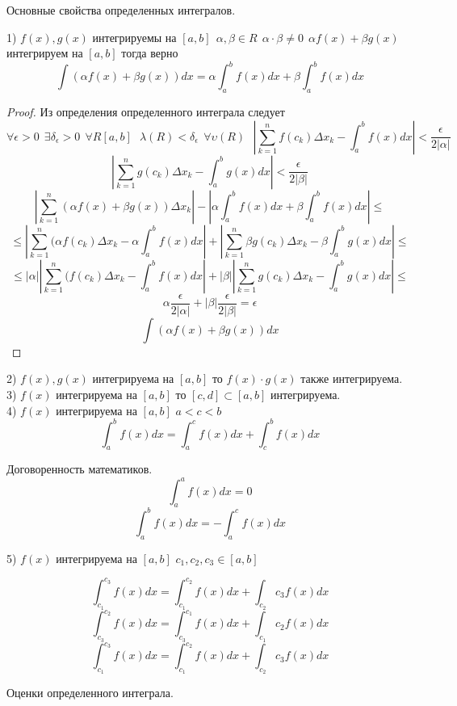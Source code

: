 \begin{title}[\Large]
    Основные свойства определенных интегралов.
\end{title}

1) $f(x), g(x)$ интегрируемы на $[a, b] ~~ \alpha , \beta \in R ~~ \alpha \cdot
\beta \not= 0 ~~ \alpha f(x) + \beta g(x)$ интегрируем на $[a, b]$ тогда верно
\[
    \int (\alpha f(x) + \beta g(x))dx = \alpha \int_a^b f(x)dx
    + \beta \int_a^b f(x)dx
\]

\begin{proof}
    Из определения определенного интеграла следует
    \[
        \forall\epsilon>0 ~~ \exists\delta_{\epsilon}>0 ~~ \forall R[a,b] ~~~
        \lambda(R) < \delta_{\epsilon} ~~ \forall\upsilon(R) ~~~
        \left| \sum_{k=1}^{n} f(c_k)\Delta x_k -
        \int_a^b f(x)dx \right| < \frac{\epsilon}{2|\alpha|}
    \]
    \[
        \left| \sum_{k=1}^{n} g(c_k)\Delta x_k -
        \int_a^b g(x)dx \right| < \frac{\epsilon}{2|\beta|}
    \]
    \[
        \left| \sum_{k=1}^{n} (\alpha f(x) + \beta g(x))\Delta x_k \right| -
        \left| \alpha \int_a^b f(x)dx + \beta \int_a^b f(x)dx \right| \le
    \]
    \[
      \le \left| \sum_{k=1}^{n} (\alpha f(c_k) \Delta x_k -
      \alpha \int_a^b f(x)dx \right| + \left| \sum_{k=1}^{n} \beta g(c_k)
      \Delta x_k - \beta \int_a^b g(x)dx \right| \le
    \]
    \[
      \le |\alpha| \left| \sum_{k=1}^{n} (f(c_k) \Delta x_k -
      \int_a^b f(x)dx \right| + |\beta| \left| \sum_{k=1}^{n} g(c_k)
      \Delta x_k - \int_a^b g(x)dx \right| \le
    \]
    \[
        \alpha \frac{\epsilon}{2|\alpha|} + |\beta| \frac{\epsilon}{2|\beta|}
        = \epsilon
    \]
    \[
        \int (\alpha f(x) + \beta g(x))dx
    \]
\end{proof}

2) $f(x), g(x)$ интегрируема на $[a, b]$ то $f(x) \cdot g(x)$ также
интегрируема.\\
3) $f(x)$ интегрируема на $[a, b]$ то $[c, d] \subset [a, b]$ интегрируема.\\
4) $f(x)$ интегрируема на $[a, b]$ $a < c < b$
    \[
        \int_a^b f(x)dx = \int_a^c f(x)dx + \int_c^b f(x)dx
    \]

Договоренность математиков.
\[
    \int_a^a f(x)dx = 0
\]
\[
    \int_a^b f(x)dx = - \int_a^c f(x)dx
\]

5) $f(x)$ интегрируема на $[a, b]$ $c_1, c_2, c_3 \in [a, b]$
\begin{proog}
    \[
    \int_{c_1}^{c_3} f(x)dx = \int_{c_1}^{c_2} f(x)dx + \int_{c_2}{c_3} f(x)dx
    \]
    \[
        \int_{c_3}^{c_2} f(x)dx = \int_{c_3}^{c_1} f(x)dx + \int_{c_1}{c_2} f(x)dx
    \]
    \[
        \int_{c_1}^{c_3} f(x)dx = \int_{c_1}^{c_2} f(x)dx + \int_{c_2}{c_3} f(x)dx
    \]
\end{proog}

\begin{title}[\Large]
    Оценки определенного интеграла.
\end{title}